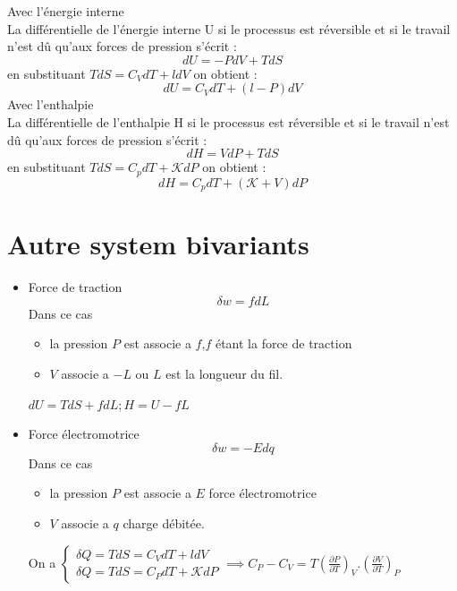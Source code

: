 \documentclass[12pt,oneside]{book}
\begin{document}
Avec l’énergie interne\\
La différentielle de l'énergie interne U si le processus est réversible et si le travail n'est dû qu'aux forces de pression s'écrit :
\[dU = -PdV + TdS\]
en substituant $TdS = C_V dT + ldV$ on obtient :
\[ \boxed{dU = C_VdT+(l-P)dV} \]
Avec l'enthalpie \\
La différentielle de l'enthalpie H si le processus est réversible et si le travail n'est dû qu'aux forces de pression s'écrit :
\[dH = VdP + TdS\]
en substituant $TdS = C_pdT + \mathcal{K}dP$ on obtient :
\[ \boxed{dH = C_pdT + (\mathcal{K}+V)dP} \]
\section{Autre system bivariants}
\begin{itemize}
    \item  Force de traction
          \[\delta w = fdL\]
          Dans ce cas
          \begin{itemize}
              \item la pression $P$ est associe a $f$,$f$ étant la force de traction
              \item $V$ associe a $-L$ ou $L$ est la longueur du fil.
          \end{itemize}
          $dU = TdS + fdL;H = U-fL$
    \item Force électromotrice
          \[\delta w = -Edq\]
          Dans ce cas
          \begin{itemize}
              \item la pression $P$ est associe a $E$ force électromotrice
              \item $V$ associe a $q$ charge débitée.
          \end{itemize}
          On a $\begin{cases}
                  \delta Q = TdS = C_VdT + ldV \\
                  \delta Q = TdS = C_PdT + \mathcal{K}dP
              \end{cases} \implies \boxed{C_P-C_V = T(\frac{\partial P}{\partial T})_V.(\frac{\partial V}{\partial T})_P} $

\end{itemize}
\end{document}
